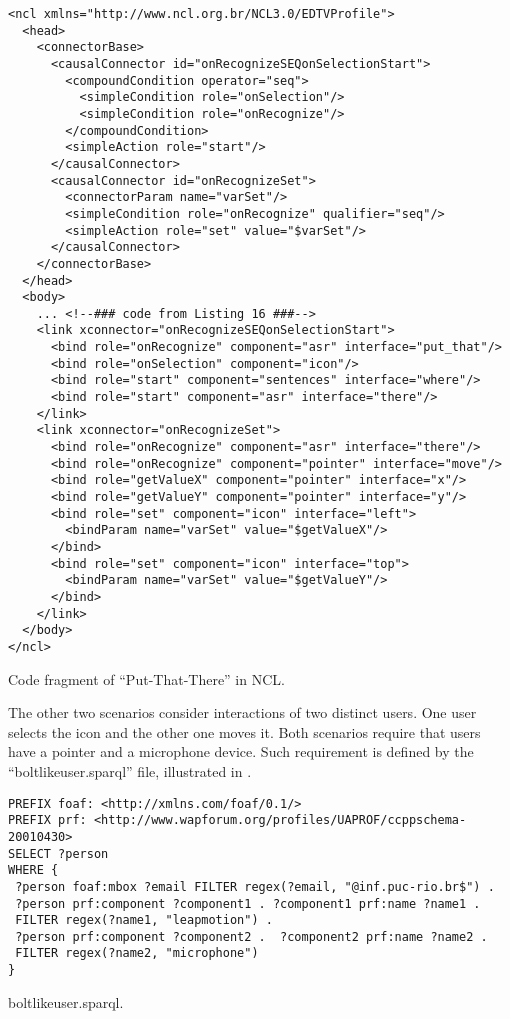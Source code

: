 \begin{verbatim}
<ncl xmlns="http://www.ncl.org.br/NCL3.0/EDTVProfile">
  <head>
    <connectorBase>
      <causalConnector id="onRecognizeSEQonSelectionStart">
        <compoundCondition operator="seq">
          <simpleCondition role="onSelection"/>
          <simpleCondition role="onRecognize"/>
        </compoundCondition>
        <simpleAction role="start"/>
      </causalConnector>
      <causalConnector id="onRecognizeSet">
        <connectorParam name="varSet"/>
        <simpleCondition role="onRecognize" qualifier="seq"/>
        <simpleAction role="set" value="$varSet"/>
      </causalConnector>
    </connectorBase>
  </head>
  <body>
    ... <!--### code from Listing 16 ###-->
    <link xconnector="onRecognizeSEQonSelectionStart">
      <bind role="onRecognize" component="asr" interface="put_that"/>
      <bind role="onSelection" component="icon"/>
      <bind role="start" component="sentences" interface="where"/>
      <bind role="start" component="asr" interface="there"/>
    </link>
    <link xconnector="onRecognizeSet">
      <bind role="onRecognize" component="asr" interface="there"/>
      <bind role="onRecognize" component="pointer" interface="move"/>
      <bind role="getValueX" component="pointer" interface="x"/>
      <bind role="getValueY" component="pointer" interface="y"/>
      <bind role="set" component="icon" interface="left">
        <bindParam name="varSet" value="$getValueX"/>
      </bind>
      <bind role="set" component="icon" interface="top">
        <bindParam name="varSet" value="$getValueY"/>
      </bind>
    </link>
  </body>
</ncl>
\end{verbatim}
\captionvspace
\begin{listing}[!ht]
\caption{Code fragment of “Put-That-There” in NCL.}

\label{list:annexb4}
\end{listing}

The other two scenarios consider interactions of two distinct users. One user
selects the icon and the other one moves it. Both scenarios require that users
have a pointer and a microphone device. Such requirement is defined by the
“boltlikeuser.sparql” file, illustrated in \label{list:annexb5}.

\begin{listing}[!ht]
\begin{verbatim}
PREFIX foaf: <http://xmlns.com/foaf/0.1/>
PREFIX prf: <http://www.wapforum.org/profiles/UAPROF/ccppschema-20010430>
SELECT ?person
WHERE {
 ?person foaf:mbox ?email FILTER regex(?email, "@inf.puc-rio.br$") .
 ?person prf:component ?component1 . ?component1 prf:name ?name1 .
 FILTER regex(?name1, "leapmotion") .
 ?person prf:component ?component2 .  ?component2 prf:name ?name2 .
 FILTER regex(?name2, "microphone")
}
\end{verbatim}
\caption{boltlikeuser.sparql.}
\label{list:annex5}
\end{listing}

